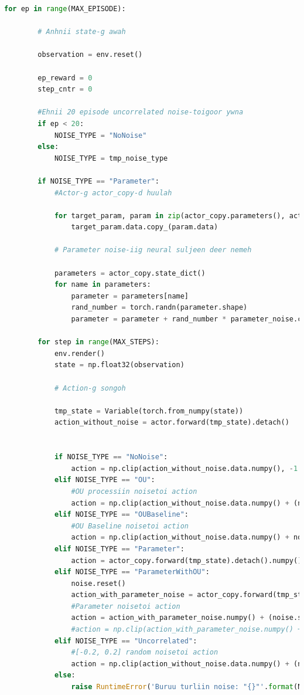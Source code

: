 \documentclass[12pt,A4]{report}
\begin{document}
\begin{lstlisting}[language=Python, caption=main.py, frame=single]
    for ep in range(MAX_EPISODE):

        # Anhnii state-g awah

        observation = env.reset()

        ep_reward = 0
        step_cntr = 0

        #Ehnii 20 episode uncorrelated noise-toigoor ywna
        if ep < 20:
            NOISE_TYPE = "NoNoise"
        else:
            NOISE_TYPE = tmp_noise_type

        if NOISE_TYPE == "Parameter":
            #Actor-g actor_copy-d huulah

            for target_param, param in zip(actor_copy.parameters(), actor.parameters()):
                target_param.data.copy_(param.data)

            # Parameter noise-iig neural suljeen deer nemeh

            parameters = actor_copy.state_dict()
            for name in parameters:
                parameter = parameters[name]
                rand_number = torch.randn(parameter.shape)
                parameter = parameter + rand_number * parameter_noise.current_stddev

        for step in range(MAX_STEPS):
            env.render()
            state = np.float32(observation)

            # Action-g songoh

            tmp_state = Variable(torch.from_numpy(state))
            action_without_noise = actor.forward(tmp_state).detach()


            if NOISE_TYPE == "NoNoise":
                action = np.clip(action_without_noise.data.numpy(), -1., 1.)
            elif NOISE_TYPE == "OU":
                #OU processiin noisetoi action
                action = np.clip(action_without_noise.data.numpy() + (noise.sample() * action_max), -1., 1.)
            elif NOISE_TYPE == "OUBaseline":
                #OU Baseline noisetoi action
                action = np.clip(action_without_noise.data.numpy() + noise(), -1., 1.)
            elif NOISE_TYPE == "Parameter":
                action = actor_copy.forward(tmp_state).detach().numpy()
            elif NOISE_TYPE == "ParameterWithOU":
                noise.reset()
                action_with_parameter_noise = actor_copy.forward(tmp_state).detach()
                #Parameter noisetoi action
                action = action_with_parameter_noise.numpy() + (noise.sample() * action_max)
                #action = np.clip(action_with_parameter_noise.numpy() + noise(), -1., 1.)
            elif NOISE_TYPE == "Uncorrelated":
                #[-0.2, 0.2] random noisetoi action
                action = np.clip(action_without_noise.data.numpy() + (np.random.uniform(-0.2,0.2) * action_max), -1., 1.)
            else:
                raise RuntimeError('Buruu turliin noise: "{}"'.format(NOISE_TYPE)) 
                

\end{lstlisting}
\end{document}

